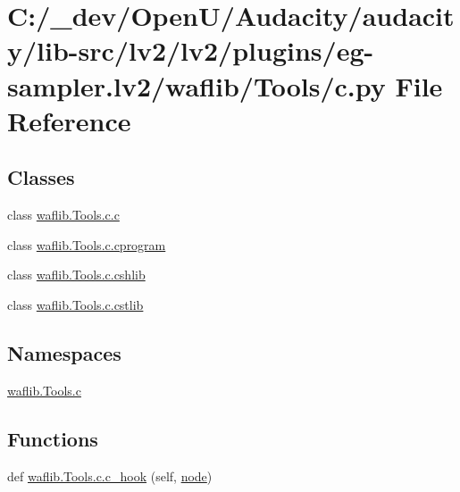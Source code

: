 \hypertarget{lv2_2plugins_2eg-sampler_8lv2_2waflib_2_tools_2c_8py}{}\section{C\+:/\+\_\+dev/\+Open\+U/\+Audacity/audacity/lib-\/src/lv2/lv2/plugins/eg-\/sampler.lv2/waflib/\+Tools/c.py File Reference}
\label{lv2_2plugins_2eg-sampler_8lv2_2waflib_2_tools_2c_8py}
\subsection*{Classes}
\begin{DoxyCompactItemize}
\item 
class \hyperlink{classwaflib_1_1_tools_1_1c_1_1c}{waflib.\+Tools.\+c.\+c}
\item 
class \hyperlink{classwaflib_1_1_tools_1_1c_1_1cprogram}{waflib.\+Tools.\+c.\+cprogram}
\item 
class \hyperlink{classwaflib_1_1_tools_1_1c_1_1cshlib}{waflib.\+Tools.\+c.\+cshlib}
\item 
class \hyperlink{classwaflib_1_1_tools_1_1c_1_1cstlib}{waflib.\+Tools.\+c.\+cstlib}
\end{DoxyCompactItemize}
\subsection*{Namespaces}
\begin{DoxyCompactItemize}
\item 
 \hyperlink{namespacewaflib_1_1_tools_1_1c}{waflib.\+Tools.\+c}
\end{DoxyCompactItemize}
\subsection*{Functions}
\begin{DoxyCompactItemize}
\item 
def \hyperlink{namespacewaflib_1_1_tools_1_1c_a133cda6439588809c5d3ccdc6bf3c5d1}{waflib.\+Tools.\+c.\+c\+\_\+hook} (self, \hyperlink{structnode}{node})
\end{DoxyCompactItemize}
